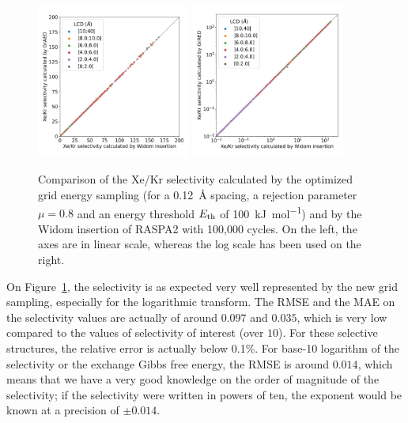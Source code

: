 \documentclass[main]{subfiles}
\begin{document}
\begin{figure}[ht]
  \centering
    \includegraphics[width=0.45\textwidth]{figures/3-fastsim/s_0_widom_vs_s_0_grid_overview.jpg}
    \includegraphics[width=0.45\textwidth]{figures/3-fastsim/s_0_widom_vs_s_0_grid_overview_log.jpg}
    \caption{Comparison of the Xe/Kr selectivity calculated by the optimized grid energy sampling (for a \SI{0.12}{\angstrom} spacing, a rejection parameter $\mu=0.8$ and an energy threshold $E_{\text{th}}$ of \SI{100}{\kilo\joule\per\mole}) and by the Widom insertion of RASPA2 with 100,000 cycles. On the left, the axes are in linear scale, whereas the log scale has been used on the right. }\label{fgr:grid_widom_selectivity}
\end{figure}

On Figure~\ref{fgr:grid_widom_selectivity}, the selectivity is as expected very well represented by the new grid sampling, especially for the logarithmic transform. The RMSE and the MAE on the selectivity values are actually of around $0.097$ and $0.035$, which is very low compared to the values of selectivity of interest (over $10$). For these selective structures, the relative error is actually below {0.1\%}. For base-10 logarithm of the selectivity or the exchange Gibbs free energy, the RMSE is around $0.014$, which means that we have a very good knowledge on the order of magnitude of the selectivity; if the selectivity were written in powers of ten, the exponent would be known at a precision of $\pm 0.014$.
\end{document}
